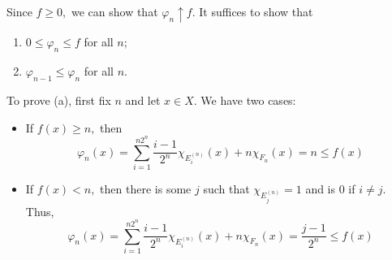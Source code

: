 \documentclass[11pt]{article}
\begin{document}
\begin{solution}
    Since $f \geq 0,$ we can show that $\varphi_n \uparrow f.$ It suffices to show that 
    \begin{enumerate}
        \item $0 \leq \varphi_n \leq f$ for all $n;$
        \item $\varphi_{n-1} \leq \varphi_{n}$ for all $n.$
    \end{enumerate}
    To prove (a), first fix $n$ and let $x\in X.$ We have two cases:
    \begin{itemize}
        \item If $f(x) \geq n,$ then 
        \[\varphi_n(x) = \sum_{i=1}^{n2^n} \frac{i-1}{2^n}\chi_{E_i^{(n)}}(x) + n\chi_{F_n}(x) = n \leq f(x)\]
        \item If $f(x) < n,$ then there is some $j$ such that $\chi_{E^{(n)}_j} = 1$ and is $0$ if $i \neq j.$ Thus, 
        \[\varphi_n(x) = \sum_{i=1}^{n2^n} \frac{i-1}{2^n}\chi_{E_i^{(n)}}(x) + n\chi_{F_n}(x) = \frac{j-1}{2^n} \leq f(x)\]
    \end{itemize}


\end{solution}
\end{document}
